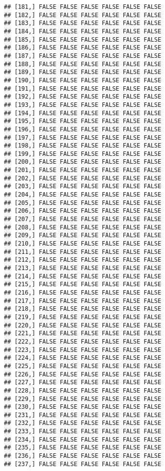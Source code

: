 \documentclass[
]{article}
\begin{document}
\begin{verbatim}
## [181,] FALSE FALSE FALSE FALSE FALSE FALSE
## [182,] FALSE FALSE FALSE FALSE FALSE FALSE
## [183,] FALSE FALSE FALSE FALSE FALSE FALSE
## [184,] FALSE FALSE FALSE FALSE FALSE FALSE
## [185,] FALSE FALSE FALSE FALSE FALSE FALSE
## [186,] FALSE FALSE FALSE FALSE FALSE FALSE
## [187,] FALSE FALSE FALSE FALSE FALSE FALSE
## [188,] FALSE FALSE FALSE FALSE FALSE FALSE
## [189,] FALSE FALSE FALSE FALSE FALSE FALSE
## [190,] FALSE FALSE FALSE FALSE FALSE FALSE
## [191,] FALSE FALSE FALSE FALSE FALSE FALSE
## [192,] FALSE FALSE FALSE FALSE FALSE FALSE
## [193,] FALSE FALSE FALSE FALSE FALSE FALSE
## [194,] FALSE FALSE FALSE FALSE FALSE FALSE
## [195,] FALSE FALSE FALSE FALSE FALSE FALSE
## [196,] FALSE FALSE FALSE FALSE FALSE FALSE
## [197,] FALSE FALSE FALSE FALSE FALSE FALSE
## [198,] FALSE FALSE FALSE FALSE FALSE FALSE
## [199,] FALSE FALSE FALSE FALSE FALSE FALSE
## [200,] FALSE FALSE FALSE FALSE FALSE FALSE
## [201,] FALSE FALSE FALSE FALSE FALSE FALSE
## [202,] FALSE FALSE FALSE FALSE FALSE FALSE
## [203,] FALSE FALSE FALSE FALSE FALSE FALSE
## [204,] FALSE FALSE FALSE FALSE FALSE FALSE
## [205,] FALSE FALSE FALSE FALSE FALSE FALSE
## [206,] FALSE FALSE FALSE FALSE FALSE FALSE
## [207,] FALSE FALSE FALSE FALSE FALSE FALSE
## [208,] FALSE FALSE FALSE FALSE FALSE FALSE
## [209,] FALSE FALSE FALSE FALSE FALSE FALSE
## [210,] FALSE FALSE FALSE FALSE FALSE FALSE
## [211,] FALSE FALSE FALSE FALSE FALSE FALSE
## [212,] FALSE FALSE FALSE FALSE FALSE FALSE
## [213,] FALSE FALSE FALSE FALSE FALSE FALSE
## [214,] FALSE FALSE FALSE FALSE FALSE FALSE
## [215,] FALSE FALSE FALSE FALSE FALSE FALSE
## [216,] FALSE FALSE FALSE FALSE FALSE FALSE
## [217,] FALSE FALSE FALSE FALSE FALSE FALSE
## [218,] FALSE FALSE FALSE FALSE FALSE FALSE
## [219,] FALSE FALSE FALSE FALSE FALSE FALSE
## [220,] FALSE FALSE FALSE FALSE FALSE FALSE
## [221,] FALSE FALSE FALSE FALSE FALSE FALSE
## [222,] FALSE FALSE FALSE FALSE FALSE FALSE
## [223,] FALSE FALSE FALSE FALSE FALSE FALSE
## [224,] FALSE FALSE FALSE FALSE FALSE FALSE
## [225,] FALSE FALSE FALSE FALSE FALSE FALSE
## [226,] FALSE FALSE FALSE FALSE FALSE FALSE
## [227,] FALSE FALSE FALSE FALSE FALSE FALSE
## [228,] FALSE FALSE FALSE FALSE FALSE FALSE
## [229,] FALSE FALSE FALSE FALSE FALSE FALSE
## [230,] FALSE FALSE FALSE FALSE FALSE FALSE
## [231,] FALSE FALSE FALSE FALSE FALSE FALSE
## [232,] FALSE FALSE FALSE FALSE FALSE FALSE
## [233,] FALSE FALSE FALSE FALSE FALSE FALSE
## [234,] FALSE FALSE FALSE FALSE FALSE FALSE
## [235,] FALSE FALSE FALSE FALSE FALSE FALSE
## [236,] FALSE FALSE FALSE FALSE FALSE FALSE
## [237,] FALSE FALSE FALSE FALSE FALSE FALSE

\end{verbatim}
\end{document}
